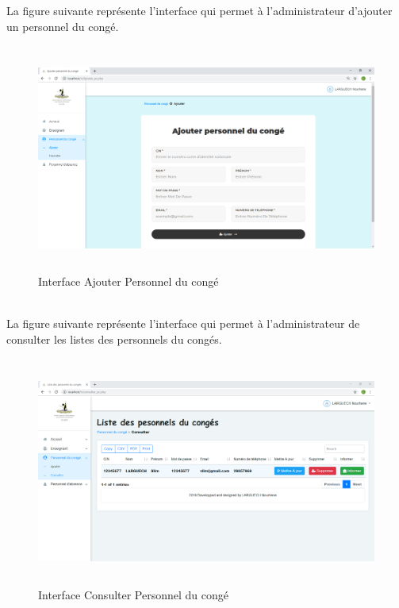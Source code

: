 \documentclass[12 pt]{report}
\begin{document}
La figure suivante représente l'interface qui permet à l'administrateur d'ajouter  un personnel du congé.
\begin{figure}[h]
 \begin{center}
\includegraphics[width= 18 cm ,height=  7.5cm]{ajouter_pc.PNG}
\caption{Interface Ajouter Personnel du congé}

\end{center}
\end{figure}\\

La figure suivante représente l'interface qui permet à l'administrateur de consulter les listes des personnels du congés.
\begin{figure}[h]
 \begin{center}
\includegraphics[width= 18 cm ,height=  7.5cm]{consulter_pc.PNG}
\caption{Interface Consulter Personnel du congé}

\end{center}
\end{figure}\\
\end{document}
